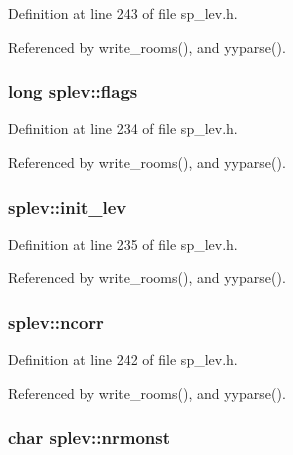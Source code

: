 Definition at line 243 of file sp\+\_\+lev.\+h.



Referenced by write\+\_\+rooms(), and yyparse().

\hypertarget{structsplev_a4f7ba4188d5d296fd6ed959183af660c}{
\subsubsection[{flags}]{\setlength{\rightskip}{0pt plus 5cm}long splev\+::flags}}\label{structsplev_a4f7ba4188d5d296fd6ed959183af660c}


Definition at line 234 of file sp\+\_\+lev.\+h.



Referenced by write\+\_\+rooms(), and yyparse().

\hypertarget{structsplev_a97a8b75e38c352ba437bd9fa290f3ccd}{
\subsubsection[{init\+\_\+lev}]{ splev\+::init\+\_\+lev}}\label{structsplev_a97a8b75e38c352ba437bd9fa290f3ccd}


Definition at line 235 of file sp\+\_\+lev.\+h.



Referenced by write\+\_\+rooms(), and yyparse().

\hypertarget{structsplev_abffd053b9b292d9be01c0f3c37be3d25}{
\subsubsection[{ncorr}]{ splev\+::ncorr}}\label{structsplev_abffd053b9b292d9be01c0f3c37be3d25}


Definition at line 242 of file sp\+\_\+lev.\+h.



Referenced by write\+\_\+rooms(), and yyparse().

\hypertarget{structsplev_a11a95089572de3a93c0bbfd541a204a2}{
\subsubsection[{nrmonst}]{\setlength{\rightskip}{0pt plus 5cm}char splev\+::nrmonst}}\label{structsplev_a11a95089572de3a93c0bbfd541a204a2}


